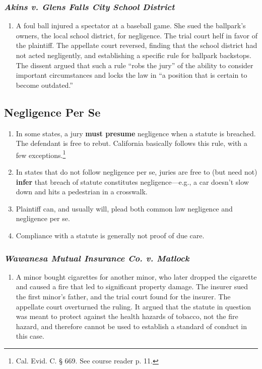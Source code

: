 \subsubsection{\emph{Akins v. Glens Falls City School District}}

\begin{enumerate}
    \item A foul ball injured a spectator at a baseball game. She sued the ballpark's owners, the local school district, for negligence. The trial court helf in favor of the plaintiff. The appellate court reversed, finding that the school district had not acted negligently, and establishing a specific rule for ballpark backstops. The dissent argued that such a rule ``robs the jury'' of the ability to consider important circumstances and locks the law in ``a position that is certain to become outdated.''
\end{enumerate}

\subsection{Negligence Per Se}

\begin{enumerate}
    \item In some states, a jury \textbf{must presume} negligence when a statute is breached. The defendant is free to rebut. California basically follows this rule, with a few exceptions.\footnote{Cal. Evid. C. § 669. See course reader p. 11.} 
    \item In states that do not follow negligence per se, juries are free to (but need not) \textbf{infer} that breach of statute constitutes negligence---e.g., a car doesn't slow down and hits a pedestrian in a crosswalk.
    \item Plaintiff can, and usually will, plead both common law negligence and negligence per se.
    \item Compliance with a statute is generally not proof of due care.
\end{enumerate}

\subsubsection{\emph{Wawanesa Mutual Insurance Co. v. Matlock}}

\begin{enumerate}
    \item A minor bought cigarettes for another minor, who later dropped the cigarette and caused a fire that led to significant property damage. The insurer sued the first minor's father, and the trial court found for the insurer. The appellate court overturned the ruling. It argued that the statute in question was meant to protect against the health hazards of tobacco, not the fire hazard, and therefore cannot be used to establish a standard of conduct in this case.
\end{enumerate}

